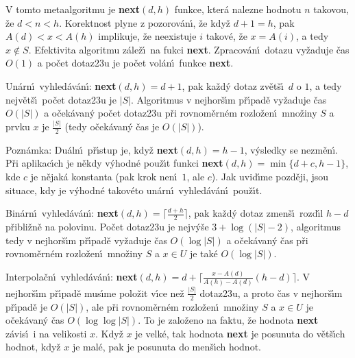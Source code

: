\documentclass[a4paper,12pt]{article}
\begin{document}
\flushpar V tomto metaalgoritmu je {\bf next$(d,h)$} funkce, kter\'a 
nalezne hodnotu $n$ takovou, \v ze $d<n<h$. Korektnost plyne 
z pozorov\'an\'\i , \v ze kdy\v z $d+1=h$, pak $A(d)<x<A(h)$ 
implikuje, \v ze neexistuje $i$ takov\'e, \v ze $x=A(i)$, a tedy 
$x\notin S$. Efektivita algoritmu z\'ale\v z\'\i\ na fukci {\bf next}. 
Zpracov\'an\'\i\ dotazu vy\v zaduje \v cas $O(1)$ a po\v cet 
dotaz\accent23u je 
po\v cet vol\'an\'\i\ funkce {\bf next}. 
\medskip

\flushpar Un\'arn\'\i\ vyhled\'av\'an\'\i : {\bf next$(d,h)=d+1$}, pak ka\v zd\'y 
dotaz zv\v et\v s\'\i\ $d$ o $1$, a tedy nejv\v et\v s\'\i\ po\v cet 
dotaz\accent23u je $|S|$. Algoritmus v nej\-hor\v s\'\i m p\v r\'\i pad\v e 
vy\v zaduje \v cas $O(|S|)$ a o\v cek\'avan\'y po\v cet dotaz\accent23u p\v ri 
rovnom\v ern\'em rozlo\v zen\'\i\ mno\v ziny $S$ a prvku $x$ je $\frac {
|S|}2$ 
(tedy o\v cek\'avan\'y \v cas je $O(|S|)$). 
\medskip

\flushpar Pozn\'amka: Du\'aln\'\i\ p\v r\'\i stup je, kdy\v z 
{\bf next$(d,h)=h-1$}, v\'ysled\-ky se nezm\v en\'\i . P\v ri aplikac\'\i ch je 
n\v ekdy v\'yhodn\'e pou\v z\'\i t funkci {\bf next$(d,h)=\min\{d
+c,h-1\}$}, 
kde $c$ je n\v ejak\'a konstanta (pak krok nen\'\i\ $1$, ale $c$). Jak 
uvid\'\i me pozd\v eji, jsou situace, kdy je v\'yhodn\'e  
takov\'eto un\'arn\'\i\ vyhled\'av\'an\'\i\ pou\v z\'\i t.
\medskip

\flushpar Bin\'arn\'\i\ vyhled\'av\'an\'\i : {\bf next$(d,h)=\lceil\frac {
d+h}2\rceil$}, pak 
ka\v zd\'y dotaz zmen\v s\'\i\ rozd\'\i l $h-d$ p\v ribli\v zn\v e na polovinu. 
Po\v cet dotaz\accent23u je nejv\'y\v se $3+\log(|S|-2)$, 
algoritmus tedy v 
nejhor\v s\'\i m p\v r\'\i pad\v e vy\v zaduje \v cas $O(\log|S|)$ a  
o\v cek\'avan\'y \v cas p\v ri rovnom\v ern\'em roz\-lo\v zen\'\i\ mno\v ziny $
S$ a 
$x\in U$ je tak\'e $O(\log|S|)$.
\medskip

\flushpar Interpola\v cn\'\i\ vyhled\'av\'an\'\i : 
{\bf next$(d,h)=d+\lceil\frac {x-A(d)}{A(h)-A(d)}(h-d)\rceil$}. V nejhor\v s\'\i m p\v r\'\i pad\v e 
mus\'\i me polo\v zit v\'\i ce ne\v z $\frac {|S|}2$ dotaz\accent23u, a proto \v cas 
v nejhor\v s\'\i m p\v r\'\i pad\v e je $O(|S|)$, ale p\v ri rovnom\v ern\'em 
roz\-lo\v zen\'\i\ mno\v ziny $S$ a $x\in U$ je o\v cek\'avan\'y \v cas 
$O(\log\log|S|)$. To je zalo\v zeno na faktu, \v ze hodnota {\bf next }
z\'avis\'\i\ i na velikosti $x$. Kdy\v z $x$ je velk\'e, tak hodnota 
{\bf next} je posunuta do v\v et\v s\'\i ch hodnot, kdy\v z $x$ je mal\'e, 
pak je posunuta do men\v s\'\i ch hodnot.
\medskip
\end{document}
